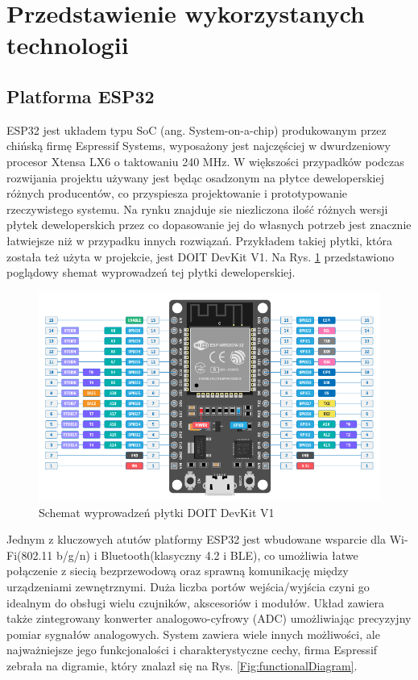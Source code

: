 \documentclass[12pt,twoside]{article}
\begin{document}
\section{Przedstawienie wykorzystanych technologii}
\subsection{Platforma ESP32}
ESP32 jest układem typu SoC (ang. System-on-a-chip) produkowanym przez chińską firmę Espressif Systems,
wyposażony jest najczęściej w dwurdzeniowy procesor Xtensa LX6 o taktowaniu 240 MHz\cite{esp32Datasheet}. W większości przypadków podczas rozwijania projektu używany jest będąc osadzonym na płytce deweloperskiej różnych producentów, co przyspiesza projektowanie i prototypowanie rzeczywistego systemu. Na rynku znajduje sie niezliczona ilość różnych wersji płytek deweloperskich przez co dopasowanie
jej do własnych potrzeb jest znacznie łatwiejsze niż w przypadku innych rozwiązań. Przykładem takiej płytki, która została też użyta w projekcie, jest DOIT DevKit V1\cite{doitDevKitV1}. Na Rys. \ref*{Fig:devkitScheme} przedstawiono poglądowy shemat wyprowadzeń tej płytki deweloperskiej.

\begin{figure}[ht]
   \centering
   \includegraphics[width=13cm]{images/doit_devkit_v1.png}
   \caption{Schemat wyprowadzeń płytki DOIT DevKit V1 \cite{doitDevKitV1}}
   \label{Fig:devkitScheme}
\end{figure}

Jednym z kluczowych atutów platformy ESP32 jest wbudowane wsparcie dla Wi-Fi(802.11 b/g/n) i Bluetooth(klasyczny 4.2 i BLE), co umożliwia łatwe połączenie z siecią bezprzewodową oraz sprawną komunikację między urządzeniami zewnętrznymi.
Duża licz\-ba portów wejścia/wyjścia czyni go idealnym do obsługi wielu czujników, akscesoriów i modułów. Układ zawiera także zintegrowany konwerter analogowo-cyfrowy (ADC) umożliwiając precyzyjny pomiar sygnałów analogowych. System zawiera wiele innych możliwości, ale najważniejsze jego funkcjonalości i charakterystyczne cechy, firma Espressif zebrała na digramie,  który znalazł się na Rys. \ref*{Fig:functionalDiagram}.
\end{document}
